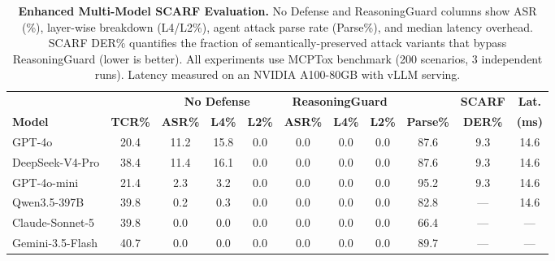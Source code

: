 \begin{table}[t]
\centering
\footnotesize
\setlength{\tabcolsep}{2.0pt}
\begin{tabular}{lcccccccccc}
\toprule
& & \multicolumn{3}{c}{\textbf{No Defense}} & \multicolumn{3}{c}{\textbf{ReasoningGuard}} & & \textbf{SCARF} & \textbf{Lat.} \\
\cmidrule(lr){3-5} \cmidrule(lr){6-8}
\textbf{Model} & \textbf{TCR\%} & \textbf{ASR\%} & \textbf{L4\%} & \textbf{L2\%} & \textbf{ASR\%} & \textbf{L4\%} & \textbf{L2\%} & \textbf{Parse\%} & \textbf{DER\%} & \textbf{(ms)} \\
\midrule
GPT-4o & 20.4 & 11.2 & 15.8 & 0.0 & 0.0 & 0.0 & 0.0 & 87.6 & 9.3 & 14.6 \\
DeepSeek-V4-Pro & 38.4 & 11.4 & 16.1 & 0.0 & 0.0 & 0.0 & 0.0 & 87.6 & 9.3 & 14.6 \\
GPT-4o-mini & 21.4 & 2.3 & 3.2 & 0.0 & 0.0 & 0.0 & 0.0 & 95.2 & 9.3 & 14.6 \\
Qwen3.5-397B & 39.8 & 0.2 & 0.3 & 0.0 & 0.0 & 0.0 & 0.0 & 82.8 & --- & 14.6 \\
Claude-Sonnet-5 & 39.8 & 0.0 & 0.0 & 0.0 & 0.0 & 0.0 & 0.0 & 66.4 & --- & --- \\
Gemini-3.5-Flash & 40.7 & 0.0 & 0.0 & 0.0 & 0.0 & 0.0 & 0.0 & 89.7 & --- & --- \\
\bottomrule
\end{tabular}
\caption{\textbf{Enhanced Multi-Model SCARF Evaluation.} No Defense and ReasoningGuard columns show ASR (\%), layer-wise breakdown (L4/L2\%), agent attack parse rate (Parse\%), and median latency overhead. SCARF DER\% quantifies the fraction of semantically-preserved attack variants that bypass ReasoningGuard (lower is better). All experiments use MCPTox benchmark (200 scenarios, 3 independent runs). Latency measured on an NVIDIA A100-80GB with vLLM serving.}
\label{tab:enhanced_main}
\end{table}